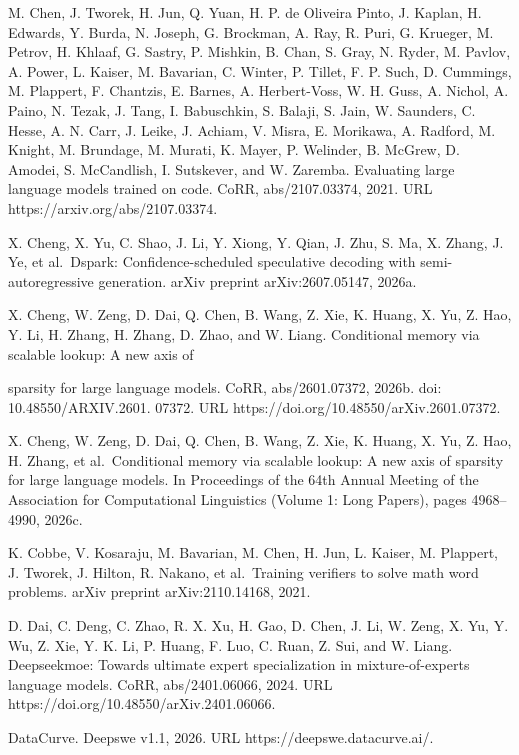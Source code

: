 M. Chen, J. Tworek, H. Jun, Q. Yuan, H. P. de Oliveira Pinto, J. Kaplan,
H. Edwards, Y. Burda, N. Joseph, G. Brockman, A. Ray, R. Puri, G.
Krueger, M. Petrov, H. Khlaaf, G. Sastry, P. Mishkin, B. Chan, S. Gray,
N. Ryder, M. Pavlov, A. Power, L. Kaiser, M. Bavarian, C. Winter, P.
Tillet, F. P. Such, D. Cummings, M. Plappert, F. Chantzis, E. Barnes, A.
Herbert-Voss, W. H. Guss, A. Nichol, A. Paino, N. Tezak, J. Tang, I.
Babuschkin, S. Balaji, S. Jain, W. Saunders, C. Hesse, A. N. Carr, J.
Leike, J. Achiam, V. Misra, E. Morikawa, A. Radford, M. Knight, M.
Brundage, M. Murati, K. Mayer, P. Welinder, B. McGrew, D. Amodei, S.
McCandlish, I. Sutskever, and W. Zaremba. Evaluating large language
models trained on code. CoRR, abs/2107.03374, 2021. URL
https://arxiv.org/abs/2107.03374.

X. Cheng, X. Yu, C. Shao, J. Li, Y. Xiong, Y. Qian, J. Zhu, S. Ma, X.
Zhang, J. Ye, et al.~Dspark: Confidence-scheduled speculative decoding
with semi-autoregressive generation. arXiv preprint arXiv:2607.05147,
2026a.

X. Cheng, W. Zeng, D. Dai, Q. Chen, B. Wang, Z. Xie, K. Huang, X. Yu, Z.
Hao, Y. Li, H. Zhang, H. Zhang, D. Zhao, and W. Liang. Conditional
memory via scalable lookup: A new axis of



sparsity for large language models. CoRR, abs/2601.07372, 2026b. doi:
10.48550/ARXIV.2601. 07372. URL
https://doi.org/10.48550/arXiv.2601.07372.

X. Cheng, W. Zeng, D. Dai, Q. Chen, B. Wang, Z. Xie, K. Huang, X. Yu, Z.
Hao, H. Zhang, et al.~Conditional memory via scalable lookup: A new axis
of sparsity for large language models. In Proceedings of the 64th Annual
Meeting of the Association for Computational Linguistics (Volume 1: Long
Papers), pages 4968--4990, 2026c.

K. Cobbe, V. Kosaraju, M. Bavarian, M. Chen, H. Jun, L. Kaiser, M.
Plappert, J. Tworek, J. Hilton, R. Nakano, et al.~Training verifiers to
solve math word problems. arXiv preprint arXiv:2110.14168, 2021.

D. Dai, C. Deng, C. Zhao, R. X. Xu, H. Gao, D. Chen, J. Li, W. Zeng, X.
Yu, Y. Wu, Z. Xie, Y. K. Li, P. Huang, F. Luo, C. Ruan, Z. Sui, and W.
Liang. Deepseekmoe: Towards ultimate expert specialization in
mixture-of-experts language models. CoRR, abs/2401.06066, 2024. URL
https://doi.org/10.48550/arXiv.2401.06066.

DataCurve. Deepswe v1.1, 2026. URL https://deepswe.datacurve.ai/.

